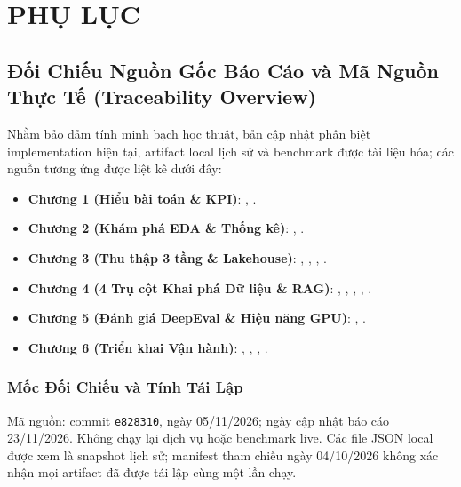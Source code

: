 
\chapter*{PHỤ LỤC}
\renewcommand{\thesection}{\Alph{section}}
\setcounter{section}{0}

\section{Đối Chiếu Nguồn Gốc Báo Cáo và Mã Nguồn Thực Tế (Traceability Overview)}

Nhằm bảo đảm tính minh bạch học thuật, bản cập nhật phân biệt implementation hiện tại, artifact local lịch sử và benchmark được tài liệu hóa; các nguồn tương ứng được liệt kê dưới đây:

\begin{itemize}[leftmargin=1.5cm]
  \item \textbf{Chương 1 (Hiểu bài toán \& KPI)}: , .
  \item \textbf{Chương 2 (Khám phá EDA \& Thống kê)}: , .
  \item \textbf{Chương 3 (Thu thập 3 tầng \& Lakehouse)}: , , , .
  \item \textbf{Chương 4 (4 Trụ cột Khai phá Dữ liệu \& RAG)}: , , , , .
  \item \textbf{Chương 5 (Đánh giá DeepEval \& Hiệu năng GPU)}: , .
  \item \textbf{Chương 6 (Triển khai Vận hành)}: , , , .
\end{itemize}

\subsection{Mốc Đối Chiếu và Tính Tái Lập}
Mã nguồn: commit \texttt{e828310}, ngày 05/11/2026; ngày cập nhật báo cáo 23/11/2026. Không chạy lại dịch vụ hoặc benchmark live. Các file JSON local được xem là snapshot lịch sử; manifest tham chiếu ngày 04/10/2026 không xác nhận mọi artifact đã được tái lập cùng một lần chạy.


